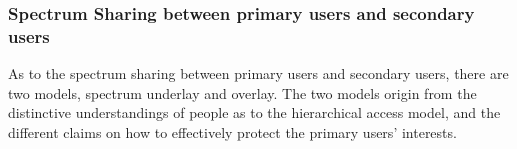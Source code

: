 \subsubsection{Spectrum Sharing between primary users and secondary users}
As to the spectrum sharing between primary users and secondary users, there are two models, spectrum underlay and overlay.
The two models origin from the distinctive understandings of people as to the hierarchical access model, and the different claims on how to effectively protect the primary users' interests.


